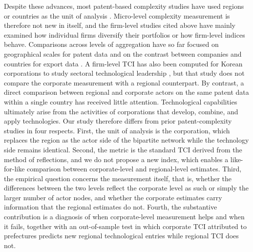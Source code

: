 \documentclass[lineno,pdflatex,sn-mathphys-num]{sn-jnl}%
\theoremstyle{thmstyleone}%
\theoremstyle{thmstyletwo}%
\theoremstyle{thmstylethree}%
\begin{document}
Despite these advances, most patent-based complexity studies have used regions or countries as the unit of analysis \cite{Hidalgo2021}.
Micro-level complexity measurement is therefore not new in itself, and the firm-level studies cited above have mainly examined how individual firms diversify their portfolios or how firm-level indices behave.
Comparisons across levels of aggregation have so far focused on geographical scales for patent data \cite{straccamore2025comparative} and on the contrast between companies and countries for export data \cite{laudati2023different}.
A firm-level TCI has also been computed for Korean corporations to study sectoral technological leadership \cite{Jun2023}, but that study does not compare the corporate measurement with a regional counterpart.
By contrast, a direct comparison between regional and corporate actors on the same patent data within a single country has received little attention.
Technological capabilities ultimately arise from the activities of corporations that develop, combine, and apply technologies.
Our study therefore differs from prior patent-complexity studies in four respects.
First, the unit of analysis is the corporation, which replaces the region as the actor side of the bipartite network while the technology side remains identical.
Second, the metric is the standard TCI derived from the method of reflections, and we do not propose a new index, which enables a like-for-like comparison between corporate-level and regional-level estimates.
Third, the empirical question concerns the measurement itself, that is, whether the differences between the two levels reflect the corporate level as such or simply the larger number of actor nodes, and whether the corporate estimates carry information that the regional estimates do not.
Fourth, the substantive contribution is a diagnosis of when corporate-level measurement helps and when it fails, together with an out-of-sample test in which corporate TCI attributed to prefectures predicts new regional technological entries while regional TCI does not.
\end{document}
